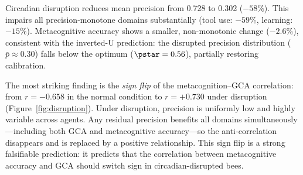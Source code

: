 Circadian disruption reduces mean precision from 0.728 to 0.302 ($-58\%$). This impairs all
precision-monotone domains substantially (tool use: $-59\%$, learning: $-15\%$). Metacognitive
accuracy shows a smaller, non-monotonic change ($-2.6\%$), consistent with the inverted-U
prediction: the disrupted precision distribution ($\bar{p} \approx 0.30$) falls below the optimum
($\pstar = 0.56$), partially restoring calibration.

The most striking finding is the \emph{sign flip} of the metacognition--GCA correlation:
from $r = -0.658$ in the normal condition to $r = +0.730$ under disruption (Figure~\ref{fig:disruption}).
Under disruption, precision is uniformly low and highly variable across agents. Any residual
precision benefits all domains simultaneously---including both GCA and metacognitive accuracy---so
the anti-correlation disappears and is replaced by a positive relationship. This sign flip is a
strong falsifiable prediction: it predicts that the correlation between metacognitive accuracy and
GCA should switch sign in circadian-disrupted bees.
